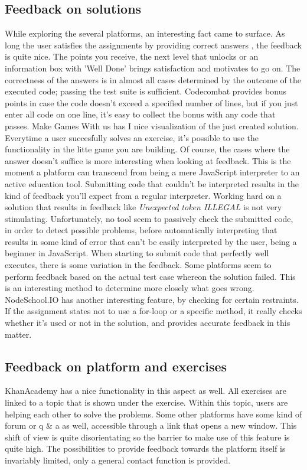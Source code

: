 \documentclass{article}
\begin{document}
\subsection{Feedback on solutions}
While exploring the several platforms, an interesting fact came to
surface. As long the user satisfies the assignments by providing correct answers
, the feedback is quite nice. The points you receive, the next level that
unlocks or an information box with 'Well Done' brings satisfaction and motivates
to go on. The correctness of the answers is in almost all cases determined by
the outcome of the executed code; passing the test suite is sufficient.
Codecombat provides bonus points in case the code doesn't exceed a specified 
number of lines, but if you just enter all code on one line, it's easy to 
collect the bonus with any code that passes. Make Games With us has I nice
visualization of the just created solution. Everytime a user succesfully solves
an exercise, it's possible to use the functionality in the litte game you are
building. \newline
Of course, the cases where the answer doesn't suffice is more interesting when
looking at feedback. This is the moment a platform can transcend from being a
mere JavaScript interpreter to an active education tool. Submitting code that 
couldn't be interpreted results in the kind of feedback you'll expect from a 
regular interpreter. Working hard on a solution that results in feedback like 
{\em Unexpected token ILLEGAL} is not very stimulating. Unfortunately, no tool 
seem to passively check the submitted code, in order to detect possible
problems, before automatically interpreting that results in some kind of error
that can't be easily interpreted by the user, being a beginner in JavaScript. 
\newline When starting to submit code that perfectly well executes, there is
some variation in the feedback. Some platforms seem to perform feedback based 
on the actual test case whereon the solution failed. This is an interesting 
method to determine more closely what goes wrong. NodeSchool.IO has another 
interesting feature, by checking for certain restraints. If the assignment 
states not to use a for-loop or a specific method, it really checks whether 
it's used or not in the solution, and provides accurate feedback in this matter.

\subsection{Feedback on platform and exercises}
KhanAcademy has a nice functionality in this aspect as well. All exercises are 
linked to a topic that is shown under the exercise. Within this topic, users are 
helping each other to solve the problems. Some other platforms have some kind
of forum or q \& a as well, accessible through a link that opens a new window. 
This shift of view is quite disorientating so the barrier to make use 
of this feature is quite high. The possibilities to provide feedback towards the 
platform itself is invariably limited, only a general contact function is 
provided. 
\end{document}
